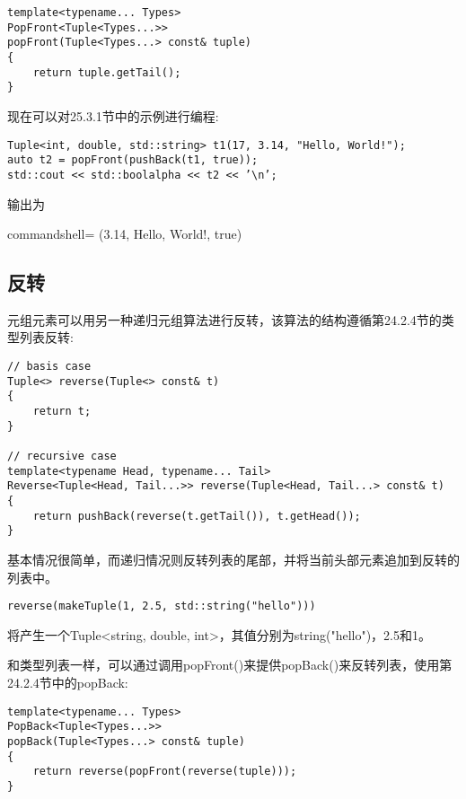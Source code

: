 \begin{lstlisting}[style=styleCXX]
template<typename... Types>
PopFront<Tuple<Types...>>
popFront(Tuple<Types...> const& tuple)
{
	return tuple.getTail();
}
\end{lstlisting}

现在可以对25.3.1节中的示例进行编程:

\begin{lstlisting}[style=styleCXX]
Tuple<int, double, std::string> t1(17, 3.14, "Hello, World!");
auto t2 = popFront(pushBack(t1, true));
std::cout << std::boolalpha << t2 << ’\n’;
\end{lstlisting}

输出为

\begin{tcblisting}{commandshell={}}
(3.14, Hello, World!, true)
\end{tcblisting}

\subsection{反转}

元组元素可以用另一种递归元组算法进行反转，该算法的结构遵循第24.2.4节的类型列表反转:

\begin{lstlisting}[style=styleCXX]
// basis case
Tuple<> reverse(Tuple<> const& t)
{
	return t;
}

// recursive case
template<typename Head, typename... Tail>
Reverse<Tuple<Head, Tail...>> reverse(Tuple<Head, Tail...> const& t)
{
	return pushBack(reverse(t.getTail()), t.getHead());
}
\end{lstlisting}

基本情况很简单，而递归情况则反转列表的尾部，并将当前头部元素追加到反转的列表中。

\begin{lstlisting}[style=styleCXX]
reverse(makeTuple(1, 2.5, std::string("hello")))
\end{lstlisting}

将产生一个Tuple<string, double, int>，其值分别为string("hello")，2.5和1。

和类型列表一样，可以通过调用popFront()来提供popBack()来反转列表，使用第24.2.4节中的popBack:

\begin{lstlisting}[style=styleCXX]
template<typename... Types>
PopBack<Tuple<Types...>>
popBack(Tuple<Types...> const& tuple)
{
	return reverse(popFront(reverse(tuple)));
}
\end{lstlisting}

